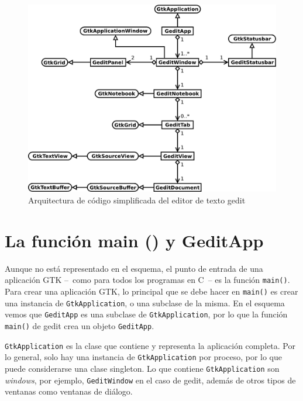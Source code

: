 \begin{figure}
  \begin{center}
    \includegraphics[width=\textwidth]{assets/img/gedit-architecture.pdf}
    \caption{Arquitectura de código simplificada del editor de texto gedit}
    \label{fig:gedit-architecture}
  \end{center}
\end{figure}

\section{La función main () y GeditApp}

Aunque no está representado en el esquema, el punto de entrada de una aplicación GTK --~como para todos los programas en C~-- es la función \lstinline{main()}. Para crear una aplicación GTK, lo principal que se debe hacer en \lstinline{main()} es crear una instancia de \lstinline{GtkApplication}, o una subclase de la misma. En el esquema vemos que \lstinline{GeditApp} es una subclase de \lstinline{GtkApplication}, por lo que la función \lstinline{main()} de gedit crea un objeto \lstinline{GeditApp}.

\lstinline{GtkApplication} es la clase que contiene y representa la aplicación completa. Por lo general, solo hay una instancia de \lstinline{GtkApplication} por proceso, por lo que puede considerarse una clase singleton. Lo que contiene \lstinline{GtkApplication} son \emph{windows}, por ejemplo, \lstinline{GeditWindow} en el caso de gedit, además de otros tipos de ventanas como ventanas de diálogo.

